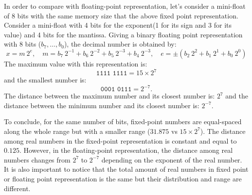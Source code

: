 In order to compare with floating-point representation,
let's consider a mini-float of 8 bits with the same memory size that 
the above fixed point representation. 
Consider a mini-float with
4 bits for the exponent(1 for its sign and 3 for its value) and 4  bits for the mantissa.
Giving a binary floating point representation with 8 bits ($b_7, \ldots, b_0$), 
the decimal number is obtained by: 
$$
   x = m \ 2^e, \quad m =  b_7 \ 2^{-1}  + b_6 \ 2^{-2} + b_5 \ 2^{-3} + b_4 \ 2^{-3}, \quad 
    e =  \pm (  b_2 \ 2^{2} + b_1 \ 2^{1} + b_0 \ 2^{0} ) 
$$
The maximum value with this representation is: 
$$
   \texttt{1111 1111} = 15 \times 2^{7}
$$   
and the smallest number is: 
$$
   \texttt{0001 0111} =  2^{-7}.
$$ 
The distance between the maximum number and its closest  number is:  $  2^{7}$
and the distance between the minimum number and its closest number is:  
$ 2^{-7}.$









To conclude, for the same number of bits, fixed-point numbers are equal-spaced  along 
the whole range but with a smaller range ($31.875$ vs $ 15 \times 2^{7}$).
The distance among real numbers in the fixed-point representation is constant and equal to $0.125$. 
However, in the floating-point representation, the distance among real numbers 
changes from $ 2^7$ to $ 2^{-7}$ depending on the exponent of the real number. 
It is also important to notice that the total amount of real numbers in fixed point or floating point 
representation is the same but their distribution and range are different.



